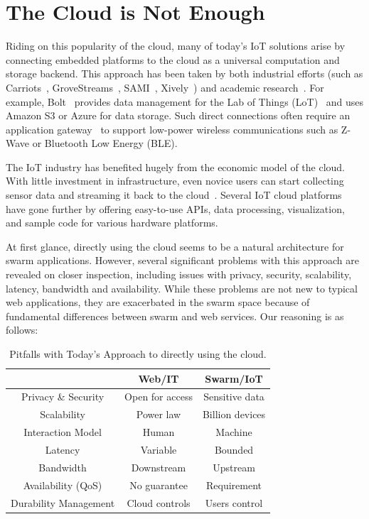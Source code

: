 \section{The Cloud is Not Enough}
\label{sec:cloud-not-enough}

Riding on this popularity of the cloud, many of today's IoT solutions arise by
connecting embedded platforms to the cloud as a universal computation and
storage backend. This approach has been taken by both industrial efforts (such
as Carriots~\cite{carriots}, GroveStreams~\cite{grovestreams}, SAMI~\cite{sami},
Xively~\cite{xively}) and academic research~\cite{gupta2014bolt,
  zachariah1001internet}. For example, Bolt~\cite{gupta2014bolt} provides data
management for the Lab of Things (LoT)~\cite{brush2013lab} and uses Amazon S3 or
Azure for data storage. Such direct connections often require an application
gateway~\cite{zachariah1001internet} to support low-power wireless
communications such as Z-Wave or Bluetooth Low Energy (BLE).

The IoT industry has benefited hugely from the economic model of the cloud.
With little investment in infrastructure, even novice users can start collecting
sensor data and streaming it back to the cloud~\cite{armbrust2010view}.  Several
IoT cloud platforms~\cite{carriots, grovestreams, xively, sami} have gone
further by offering easy-to-use APIs, data processing, visualization, and sample
code for various hardware platforms.

At first glance, directly using the cloud seems to be a natural architecture for
swarm applications. However, several significant problems with this approach are
revealed on closer inspection, including issues with privacy, security,
scalability, latency, bandwidth and availability.  While these problems are not
new to typical web applications, they are exacerbated in the swarm space because
of fundamental differences between swarm and web services. Our reasoning is as
follows:

\begin{table}
  \centering
  \begin{tabular}{c c c}
    \toprule
    & Web/IT & Swarm/IoT \\
    \midrule
    Privacy \& Security & Open for access & Sensitive data \\
    Scalability & Power law & Billion devices \\
    Interaction Model & Human & Machine \\
    Latency & Variable & Bounded  \\
    Bandwidth & Downstream & Upstream   \\
    Availability (QoS) & No guarantee & Requirement  \\
    Durability Management & Cloud controls & Users control \\
    \bottomrule
  \end{tabular}
  \caption{Pitfalls with Today's Approach to directly using the cloud.}
\end{table}

